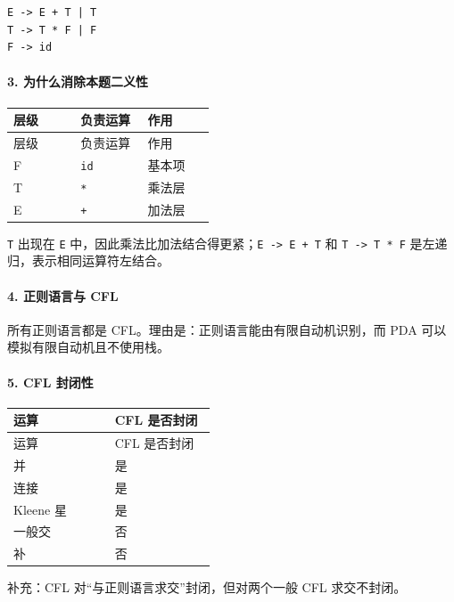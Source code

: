 \documentclass[UTF8]{ctexart}
\begin{document}
\begin{Verbatim}[fontsize=\small,breaklines=true]
E -> E + T | T
T -> T * F | F
F -> id
\end{Verbatim}

\paragraph*{3. 为什么消除本题二义性}

\begin{longtable}{|p{0.31\linewidth}|p{0.31\linewidth}|p{0.31\linewidth}|}
\hline
层级 & 负责运算 & 作用 \\
\hline
\endfirsthead
层级 & 负责运算 & 作用 \\
\hline
\endhead
F & \texttt{id} & 基本项 \\
\hline
T & \texttt{*} & 乘法层 \\
\hline
E & \texttt{+} & 加法层 \\
\hline
\end{longtable}

\texttt{T} 出现在 \texttt{E} 中，因此乘法比加法结合得更紧；\texttt{E -> E + T} 和 \texttt{T -> T * F} 是左递归，表示相同运算符左结合。

\paragraph*{4. 正则语言与 CFL}

所有正则语言都是 CFL。理由是：正则语言能由有限自动机识别，而 PDA 可以模拟有限自动机且不使用栈。

\paragraph*{5. CFL 封闭性}

\begin{longtable}{|p{0.47\linewidth}|p{0.47\linewidth}|}
\hline
运算 & CFL 是否封闭 \\
\hline
\endfirsthead
运算 & CFL 是否封闭 \\
\hline
\endhead
并 & 是 \\
\hline
连接 & 是 \\
\hline
Kleene 星 & 是 \\
\hline
一般交 & 否 \\
\hline
补 & 否 \\
\hline
\end{longtable}

补充：CFL 对“与正则语言求交”封闭，但对两个一般 CFL 求交不封闭。
\end{document}
